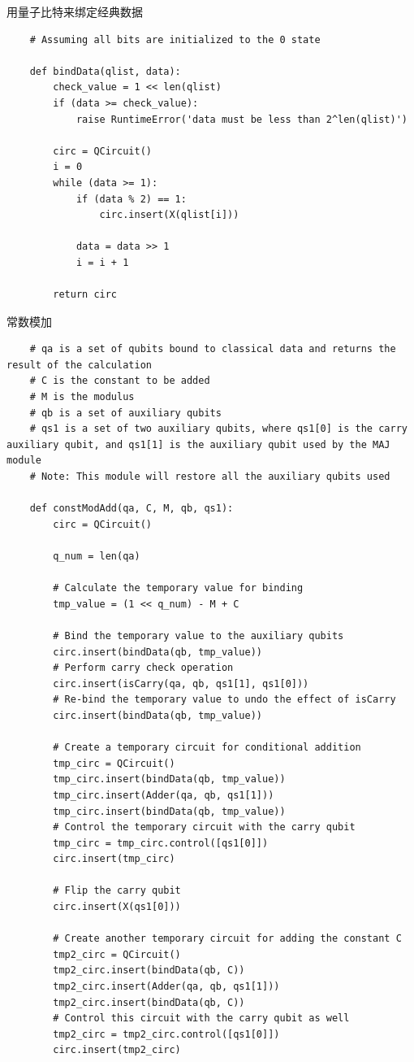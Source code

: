 \documentclass[12pt,hyperref,a4paper,UTF8]{ctexart}
\begin{document}
用量子比特来绑定经典数据
\begin{lstlisting}
    # Assuming all bits are initialized to the 0 state

    def bindData(qlist, data):
        check_value = 1 << len(qlist)
        if (data >= check_value):
            raise RuntimeError('data must be less than 2^len(qlist)')

        circ = QCircuit()
        i = 0
        while (data >= 1):
            if (data % 2) == 1:
                circ.insert(X(qlist[i]))

            data = data >> 1
            i = i + 1

        return circ
\end{lstlisting}

常数模加
\begin{lstlisting}
    # qa is a set of qubits bound to classical data and returns the result of the calculation
    # C is the constant to be added
    # M is the modulus
    # qb is a set of auxiliary qubits
    # qs1 is a set of two auxiliary qubits, where qs1[0] is the carry auxiliary qubit, and qs1[1] is the auxiliary qubit used by the MAJ module
    # Note: This module will restore all the auxiliary qubits used

    def constModAdd(qa, C, M, qb, qs1):
        circ = QCircuit()

        q_num = len(qa)

        # Calculate the temporary value for binding
        tmp_value = (1 << q_num) - M + C

        # Bind the temporary value to the auxiliary qubits
        circ.insert(bindData(qb, tmp_value))
        # Perform carry check operation
        circ.insert(isCarry(qa, qb, qs1[1], qs1[0]))
        # Re-bind the temporary value to undo the effect of isCarry
        circ.insert(bindData(qb, tmp_value))

        # Create a temporary circuit for conditional addition
        tmp_circ = QCircuit()
        tmp_circ.insert(bindData(qb, tmp_value))
        tmp_circ.insert(Adder(qa, qb, qs1[1]))
        tmp_circ.insert(bindData(qb, tmp_value))
        # Control the temporary circuit with the carry qubit
        tmp_circ = tmp_circ.control([qs1[0]])
        circ.insert(tmp_circ)

        # Flip the carry qubit
        circ.insert(X(qs1[0]))

        # Create another temporary circuit for adding the constant C
        tmp2_circ = QCircuit()
        tmp2_circ.insert(bindData(qb, C))
        tmp2_circ.insert(Adder(qa, qb, qs1[1]))
        tmp2_circ.insert(bindData(qb, C))
        # Control this circuit with the carry qubit as well
        tmp2_circ = tmp2_circ.control([qs1[0]])
        circ.insert(tmp2_circ)


\end{lstlisting}
\end{document}
